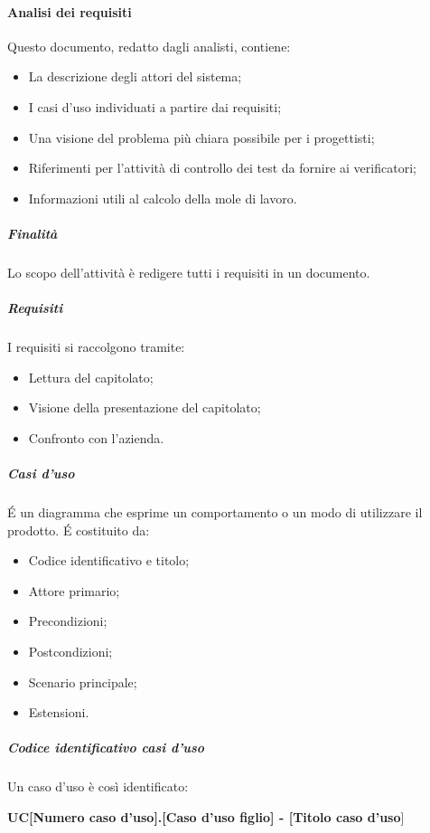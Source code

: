 \paragraph{Analisi dei requisiti}
Questo documento, redatto dagli analisti, contiene:
\begin{itemize}
\item La descrizione degli attori del sistema;
\item I casi d'uso individuati a partire dai requisiti;
\item Una visione del problema più chiara possibile per i progettisti;
\item Riferimenti per l'attività di controllo dei test da fornire ai verificatori;
\item Informazioni utili al calcolo della mole di lavoro.
\end{itemize}
\subparagraph{Finalità}
Lo scopo dell'attività è redigere tutti i requisiti in un documento.
\subparagraph{Requisiti}
I requisiti si raccolgono tramite:
\begin{itemize}
\item Lettura del capitolato;
\item Visione della presentazione del capitolato;
\item Confronto con l'azienda.
\end{itemize}
\subparagraph{Casi d'uso}
\'E un diagramma che esprime un comportamento o un modo di utilizzare il prodotto. \'E costituito da:
\begin{itemize}
\item Codice identificativo e titolo;
\item Attore primario;
\item Precondizioni;
\item Postcondizioni;
\item Scenario principale;
\item Estensioni.
\end{itemize}
\subparagraph{Codice identificativo casi d'uso}
Un caso d'uso è così identificato:

\begin{center}
\textbf{UC[Numero caso d'uso].[Caso d'uso figlio] - [Titolo caso d'uso}]
\end{center}
		
